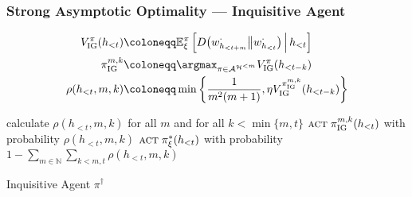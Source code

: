 \documentclass[UTF8,11pt,colorlinks,compress,openany]{beamer}%
\begin{document}
\begin{frame}\frametitle{Strong Asymptotic Optimality --- Inquisitive Agent}
\setlength\abovedisplayskip{0pt}
\setlength\belowdisplayskip{0pt}
\begin{align*}
V_{\mathrm{IG}}^\pi(h_{<t})&\coloneqq \mathbb{E}_\xi^\pi\left[D\big(w_{h_{<t+m}}^\cdot\big\| w_{h_{<t}}^\cdot\big)\,\middle|\, h_{<t}\right]\\
\pi_{\mathrm{IG}}^{m,k}&\coloneqq \argmax_{\pi\in\mathcal{A}^{\mathcal{H}^{<m}}} V_{\mathrm{IG}}^\pi(h_{<t-k})\\
\rho(h_{<t},m,k)&\coloneqq \min\left\{\frac{1}{m^2(m+1)}, \eta V_{\mathrm{IG}}^{\pi_{\mathrm{IG}}^{m,k}}(h_{<t-k})\right\}
\end{align*}
\begin{algorithm}[H]
\begin{algorithmic}[1]
\State calculate $\rho(h_{<t},m,k)$ for all $m$ and for all $k<\min\{m,t\}$
\State $\textsc{act}\;\pi_{\mathrm{IG}}^{m,k}(h_{<t})$ with probability $\rho(h_{<t},m,k)$
\State $\textsc{act}\;\pi_\xi^*(h_{<t})$ with probability $1-\sum\limits_{m\in\mathbb{N}} \sum\limits_{k<m,t}\rho(h_{<t},m,k)$
\EndWhile
\end{algorithmic}
\caption{Inquisitive Agent $\pi^\dagger$}
\end{algorithm}
\end{frame}
\end{document}
